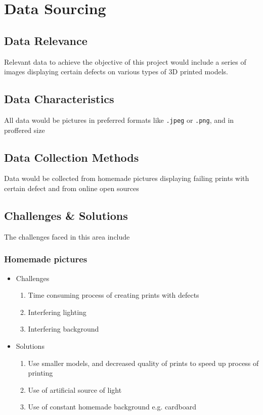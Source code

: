 \documentclass[12pt,a4paper]{article}
\begin{document}
\section{Data Sourcing}
\subsection{Data Relevance}
Relevant data to achieve the objective of this project would include a series of images displaying certain defects on various types of 3D printed models.
\subsection{Data Characteristics}
All data would be pictures in preferred formats like \verb|.jpeg| or \verb|.png|, and in proffered size 
\subsection{Data Collection Methods}
Data would be collected from homemade pictures displaying failing prints with certain defect and from online open sources 
\subsection{Challenges \& Solutions}

The challenges faced in this area include

\subsubsection{Homemade pictures}
\begin{itemize}
    \item Challenges
    \begin{enumerate}
        \item Time consuming process of creating prints with defects
        \item Interfering lighting 
        \item Interfering background
    \end{enumerate}
    \item Solutions
    \begin{enumerate}
        \item Use smaller models, and decreased quality of prints to speed up process of printing
        \item Use of artificial source of light
        \item Use of constant homemade background e.g. cardboard
    \end{enumerate}
\end{itemize}
\end{document}
